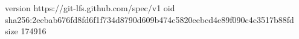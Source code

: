 version https://git-lfs.github.com/spec/v1
oid sha256:2eebab676fd8fd6f1f734d8790d609b474c5820eebcd4e89f090c4c3517b88fd
size 174916
